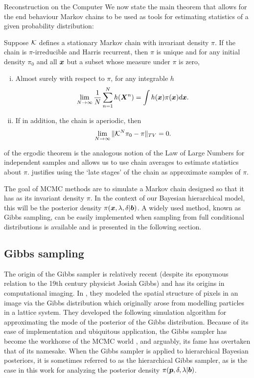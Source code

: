 \begin{chapter}{Reconstruction on the Computer}
We now state the main theorem that allows for the end behaviour Markov chains to be used as tools for estimating statistics of a given probability distribution:
\begin{thm} \label{thm:ergodicTheorem}
  \citep{tierney1994markov} Suppose $\mathcal K$ defines a stationary Markov chain with invariant density $\pi$. If the chain is $\pi$-irreducible and Harris recurrent, then $\pi$ is unique and for any initial density $\pi_0$ and all $\mbox{\boldmath$x$}$ but a subset whose measure under $\pi$ is zero,
  \begin{enumerate}[(i)]
    \item Almost surely with respect to $\pi$, for any integrable $h$ \begin{equation} \lim_{N\to \infty}\frac 1N\sum_{n=1}^N h(\mbox{\boldmath$X$}^n) = \int h(\mbox{\boldmath$x$}) \pi(\mbox{\boldmath$x$}) d\mbox{\boldmath$x$}. \label{eq:ergodicStat}\end{equation}
    \item If in addition, the chain is aperiodic, then \begin{equation} \lim_{N\to \infty}\|\mathcal K^N\pi_0 - \pi\|_{TV} = 0. \label{eq:ergodicDist}\end{equation}
  \end{enumerate}
\end{thm}
 of the ergodic theorem  is the analogous notion of the Law of Large Numbers for independent samples and allows us to use chain averages to estimate statistics about $\pi$.  
 justifies using the `late stages' of the chain as approximate samples of $\pi$.

The goal of MCMC methods are to simulate a Markov chain designed so that it has as its invariant density $\pi$.  
In the context of our Bayesian hierarchical model, this will be the posterior density $\pi(\mbox{\boldmath$x$}, \lambda, \delta| \mbox{\boldmath$b$})$.
A widely used method, known as Gibbs sampling, can be easily implemented when sampling from full conditional distributions is available and is presented in the following section.

\subsection{Gibbs sampling}

The origin of the Gibbs sampler is relatively recent (despite its eponymous relation to the 19th century physicist Josiah Gibbs) and has its origins in computational imaging. 
In \citep{geman1984stochastic}, they modeled the spatial structure of pixels in an image via the Gibbs distribution which originally arose from modelling particles in a lattice system.
They developed the following simulation algorithm for approximating the mode of the posterior of the Gibbs distribution.
Because of its ease of implementation and ubiquitous application, the Gibbs sampler has become the workhorse of the MCMC world \citep{robert2013monte}, and arguably, its fame has overtaken that of its namesake.
When the Gibbs sampler is applied to hierarchical Bayesian posteriors, it is sometimes referred to as the hierarchical Gibbs sampler, as is the case in this work for analyzing the posterior density $\pi(\mbox{\boldmath$p$},\delta,\lambda|\mbox{\boldmath$b$})$.



\end{chapter}
